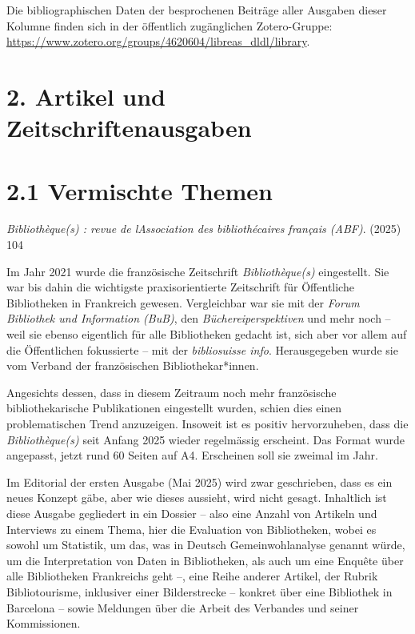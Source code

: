 \documentclass[a4paper,
fontsize=11pt,
oneside,
numbers=noperiodatend,
parskip=half-,
bibliography=totoc,
final
]{scrartcl}
\begin{document}
Die bibliographischen Daten der besprochenen Beiträge aller Ausgaben
dieser Kolumne finden sich in der öffentlich zugänglichen Zotero-Gruppe:
\url{https://www.zotero.org/groups/4620604/libreas_dldl/library}.

\section{2. Artikel und
Zeitschriftenausgaben}\label{artikel-und-zeitschriftenausgaben}

\section{2.1 Vermischte Themen}\label{vermischte-themen}

\emph{Bibliothèque(s) : revue de l\textquotesingle Association des
bibliothécaires français (ABF)}. (2025) 104

Im Jahr 2021 wurde die französische Zeitschrift \emph{Bibliothèque(s)}
eingestellt. Sie war bis dahin die wichtigste praxisorientierte
Zeitschrift für Öffentliche Bibliotheken in Frankreich gewesen.
Vergleichbar war sie mit der \emph{Forum Bibliothek und Information
(BuB)}, den \emph{Büchereiperspektiven} und mehr noch -- weil sie ebenso
eigentlich für alle Bibliotheken gedacht ist, sich aber vor allem auf
die Öffentlichen fokussierte -- mit der \emph{bibliosuisse info}.
Herausgegeben wurde sie vom Verband der französischen
Bibliothekar*innen.

Angesichts dessen, dass in diesem Zeitraum noch mehr französische
bibliothekarische Publikationen eingestellt wurden, schien dies einen
problematischen Trend anzuzeigen. Insoweit ist es positiv hervorzuheben,
dass die \emph{Bibliothèque(s)} seit Anfang 2025 wieder regelmässig
erscheint. Das Format wurde angepasst, jetzt rund 60 Seiten auf A4.
Erscheinen soll sie zweimal im Jahr.

Im Editorial der ersten Ausgabe (Mai 2025) wird zwar geschrieben, dass
es ein neues Konzept gäbe, aber wie dieses aussieht, wird nicht gesagt.
Inhaltlich ist diese Ausgabe gegliedert in ein Dossier -- also eine
Anzahl von Artikeln und Interviews zu einem Thema, hier die Evaluation
von Bibliotheken, wobei es sowohl um Statistik, um das, was in Deutsch
Gemeinwohlanalyse genannt würde, um die Interpretation von Daten in
Bibliotheken, als auch um eine Enquête über alle Bibliotheken
Frankreichs geht --, eine Reihe anderer Artikel, der Rubrik
Bibliotourisme, inklusiver einer Bilderstrecke -- konkret über eine
Bibliothek in Barcelona -- sowie Meldungen über die Arbeit des Verbandes
und seiner Kommissionen.
\end{document}
